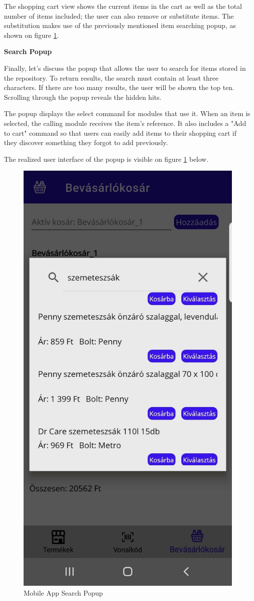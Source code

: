 The shopping cart view shows the current items in the cart as well as the total number of items included; the user can also remove or substitute items. The substitution makes use of the previously mentioned item searching popup, as shown on figure \ref{fig:appsearchpopup}.

\noindent\textbf{Search Popup}

Finally, let's discuss the popup that allows the user to search for items stored in the repository. To return results, the search must contain at least three characters. If there are too many results, the user will be shown the top ten.  Scrolling through the popup reveals the hidden hits. 

The popup displays the select command for modules that use it. When an item is selected, the calling module receives the item's reference. It also includes a "Add to cart" command so that users can easily add items to their shopping cart if they discover something they forgot to add previously.

The realized user interface of the popup is visible on figure \ref{fig:appsearchpopup} below.

\begin{figure}[H]
	\centering
	\includegraphics[width=0.3\linewidth]{img/app_search.png}
	\caption{Mobile App Search Popup}
	\label{fig:appsearchpopup}
\end{figure}